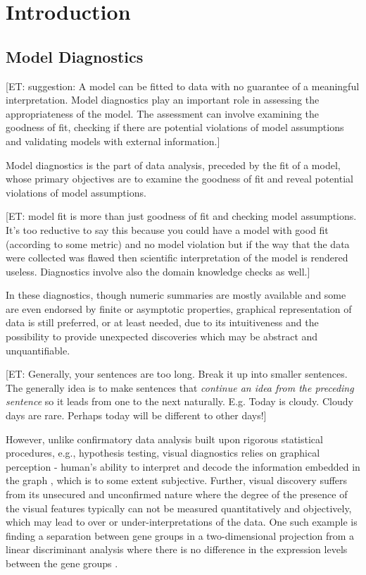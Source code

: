 \documentclass{monashthesis}
\theoremstyle{definition}
\theoremstyle{definition}
\theoremstyle{definition}
\theoremstyle{definition}
\theoremstyle{remark}
\begin{document}
\hypertarget{introduction}{%
\section{Introduction}\label{introduction}}

\hypertarget{model-diagnostics}{%
\subsection{Model Diagnostics}\label{model-diagnostics}}

{[}ET: suggestion: A model can be fitted to data with no guarantee of a meaningful interpretation. Model diagnostics play an important role in assessing the appropriateness of the model. The assessment can involve examining the goodness of fit, checking if there are potential violations of model assumptions and validating models with external information.{]}

Model diagnostics is the part of data analysis, preceded by the fit of a model, whose primary objectives are to examine the goodness of fit and reveal potential violations of model assumptions.

{[}ET: model fit is more than just goodness of fit and checking model assumptions. It's too reductive to say this because you could have a model with good fit (according to some metric) and no model violation but if the way that the data were collected was flawed then scientific interpretation of the model is rendered useless. Diagnostics involve also the domain knowledge checks as well.{]}

In these diagnostics, though numeric summaries are mostly available and some are even endorsed by finite or asymptotic properties, graphical representation of data is still preferred, or at least needed, due to its intuitiveness and the possibility to provide unexpected discoveries which may be abstract and
unquantifiable.

{[}ET: Generally, your sentences are too long. Break it up into smaller sentences. The generally idea is to make sentences that \emph{continue an idea from the preceding sentence} so it leads from one to the next naturally. E.g. Today is cloudy. Cloudy days are rare. Perhaps today will be different to other days!{]}

However, unlike confirmatory data analysis built upon rigorous statistical procedures, e.g., hypothesis testing, visual diagnostics relies on graphical perception - human's ability to interpret and decode the information embedded in the graph \autocite{cleveland_graphical_1984}, which is to some extent subjective. Further, visual discovery suffers from its unsecured and unconfirmed nature where the degree of the presence of the visual features typically can not be measured quantitatively and objectively, which may lead to over or under-interpretations of the data. One such example is finding a separation between gene groups in a two-dimensional projection from a linear discriminant analysis where there is no difference in the expression levels between the gene groups \autocite{roy_chowdhury_using_2015}.
\end{document}
